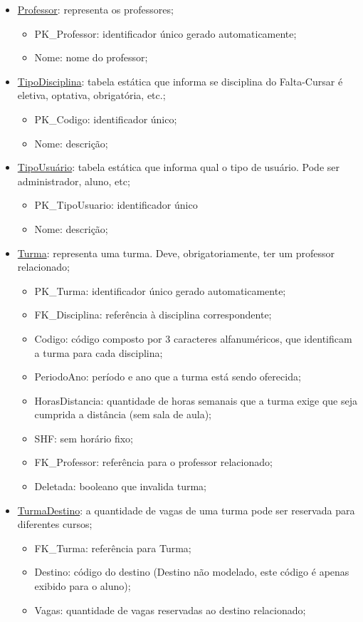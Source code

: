 \documentclass[graduacao,brazil]{ThesisPUC}
\begin{document}
\begin{itemize}
	\item \underline{Professor}: representa os professores;
	\begin{itemize}
		\item PK\_Professor: identificador único gerado automaticamente;
		\item Nome: nome do professor;
	\end{itemize}

	\item \underline{TipoDisciplina}: tabela estática que informa se disciplina do Falta-Cursar é eletiva, optativa, obrigatória, etc.;
	\begin{itemize}
		\item PK\_Codigo: identificador único;
		\item Nome: descrição;
	\end{itemize}

	\item \underline{TipoUsuário}: tabela estática que informa qual o tipo de usuário. Pode ser administrador, aluno, etc;
	\begin{itemize}
		\item PK\_TipoUsuario: identificador único
		\item Nome: descrição;
	\end{itemize}

	\item \underline{Turma}: representa uma turma. Deve, obrigatoriamente, ter um professor relacionado;
	\begin{itemize}
		\item PK\_Turma: identificador único gerado automaticamente;
		\item FK\_Disciplina: referência à disciplina correspondente;
		\item Codigo: código composto por 3 caracteres alfanuméricos, que identificam a turma para cada disciplina;
		\item PeriodoAno: período e ano que a turma está sendo oferecida;
		\item HorasDistancia: quantidade de horas semanais que a turma exige que seja cumprida a distância (sem sala de aula);
		\item SHF: sem horário fixo;
		\item FK\_Professor: referência para o professor relacionado;
		\item Deletada: booleano que invalida turma;
	\end{itemize}

	\item \underline{TurmaDestino}: a quantidade de vagas de uma turma pode ser reservada para diferentes cursos;
	\begin{itemize}
		\item FK\_Turma: referência para Turma;
		\item Destino: código do destino (Destino não modelado, este código é apenas exibido para o aluno);
		\item Vagas: quantidade de vagas reservadas ao destino relacionado;
	\end{itemize}


\end{itemize}
\end{document}
